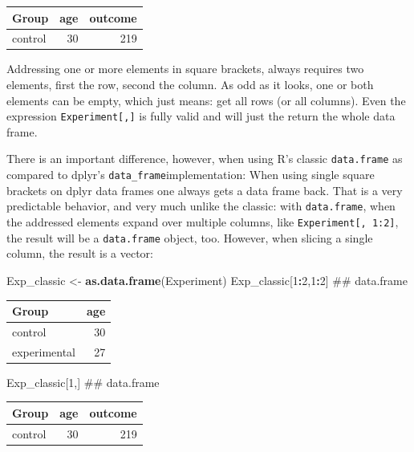 \documentclass[]{svmono}
\newenvironment{Shaded}{\begin{snugshade}}{\end{snugshade}}
\newcommand{\KeywordTok}[1]{\textcolor[rgb]{0.13,0.29,0.53}{\textbf{#1}}}
\newcommand{\DecValTok}[1]{\textcolor[rgb]{0.00,0.00,0.81}{#1}}
\newcommand{\StringTok}[1]{\textcolor[rgb]{0.31,0.60,0.02}{#1}}
\newcommand{\OperatorTok}[1]{\textcolor[rgb]{0.81,0.36,0.00}{\textbf{#1}}}
\newcommand{\NormalTok}[1]{#1}
\begin{document}
\begin{tabular}{l|r|r}
\hline
Group & age & outcome\\
\hline
control & 30 & 219\\
\hline
\end{tabular}

Addressing one or more elements in square brackets, always requires two
elements, first the row, second the column. As odd as it looks, one or
both elements can be empty, which just means: get all rows (or all
columns). Even the expression \texttt{Experiment{[},{]}} is fully valid
and will just the return the whole data frame.

There is an important difference, however, when using R's classic
\texttt{data.frame} as compared to dplyr's
\texttt{data\_frame}implementation: When using single square brackets on
dplyr data frames one always gets a data frame back. That is a very
predictable behavior, and very much unlike the classic: with
\texttt{data.frame}, when the addressed elements expand over multiple
columns, like \texttt{Experiment{[},\ 1:2{]}}, the result will be a
\texttt{data.frame} object, too. However, when slicing a single column,
the result is a vector:

\begin{Shaded}
\begin{Highlighting}[]
\NormalTok{Exp_classic <-}\StringTok{ }\KeywordTok{as.data.frame}\NormalTok{(Experiment)}
\NormalTok{Exp_classic[}\DecValTok{1}\OperatorTok{:}\DecValTok{2}\NormalTok{,}\DecValTok{1}\OperatorTok{:}\DecValTok{2}\NormalTok{]  ## data.frame}
\end{Highlighting}
\end{Shaded}

\begin{tabular}{l|r}
\hline
Group & age\\
\hline
control & 30\\
\hline
experimental & 27\\
\hline
\end{tabular}

\begin{Shaded}
\begin{Highlighting}[]
\NormalTok{Exp_classic[}\DecValTok{1}\NormalTok{,]       ## data.frame}
\end{Highlighting}
\end{Shaded}

\begin{tabular}{l|r|r}
\hline
Group & age & outcome\\
\hline
control & 30 & 219\\
\hline
\end{tabular}
\end{document}
